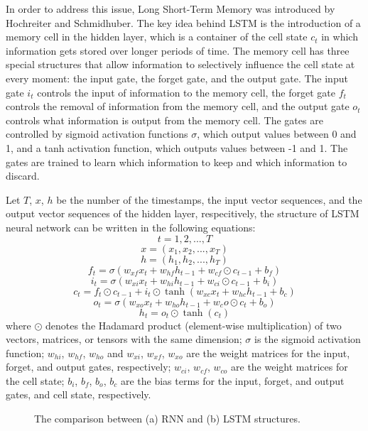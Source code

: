 \documentclass[11pt]{uonthesis}
\begin{document}
In order to address this issue, Long Short-Term Memory was introduced by Hochreiter and Schmidhuber\cite{lstm}. The key idea behind LSTM is the introduction of a memory cell in the hidden layer, which is a container of the cell state $c_t$ in which information gets stored over longer periods of time. The memory cell has three special structures that allow information to selectively influence the cell state at every moment: the input gate, the forget gate, and the output gate. The input gate $i_t$ controls the input of information to the memory cell, the forget gate $f_t$ controls the removal of information from the memory cell, and the output gate $o_t$ controls what information is output from the memory cell. The gates are controlled by sigmoid activation functions $\sigma$, which output values between 0 and 1, and a tanh activation function, which outputs values between -1 and 1. The gates are trained to learn which information to keep and which information to discard.

Let $T$, $x$, $h$ be the number of the timestamps, the input vector sequences, and the output vector sequences of the hidden layer, respecitively, the structure of LSTM neural network can be written in the following equations:
\[t = 1, 2, ..., T\]
\[x = (x_{1}, x_{2},..., x_T)\]
\[h = (h_{1}, h_{2},..., h_T)\]
\[f_t = \sigma(w_{xf} x_t + w_{hf} h_{t-1} + w_{cf} \odot c_{t-1} + b_f )\]
\[i_t = \sigma(w_{xi} x_t + w_{hi} h_{t-1} + w_{ci} \odot c_{t-1} + b_i )\]
\[c_t = f_t \odot c_{t-1} + i_t \odot \tanh(w_{xc} x_t + w_{hc} h_{t-1} + b_c)\] 
\[o_t = \sigma(w_{xo} x_t + w_{ho} h_{t-1} + w_co \odot c_t + b_o)\]
\[h_t = o_t \odot \tanh(c_t)\]
where
$\odot$ denotes the Hadamard product (element-wise multiplication) of two vectors, matrices, or tensors with the same dimension;
$\sigma$ is the sigmoid activation function;
$w_{hi}$, $w_{hf}$, $w_{ho}$ and $w_{xi}$, $w_{xf}$, $w_{xo}$ are the weight matrices for the input, forget, and output gates, respectively;
$w_{ci}$, $w_{cf}$, $w_{co}$ are the weight matrices for the cell state;
$b_i$, $b_f$, $b_o$, $b_c$ are the bias terms for the input, forget, and output gates, and cell state, respectively.


\begin{figure}[ht!]
    \centering
\caption{The comparison between (a) RNN and (b) LSTM structures.}
\label{bb}
\end{figure}
\end{document}
